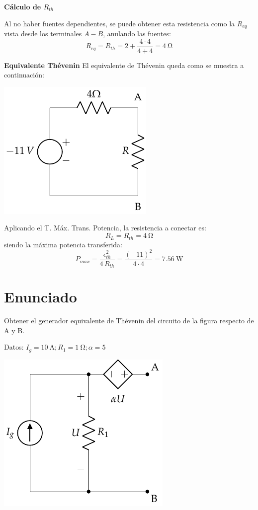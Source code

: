 \textbf{Cálculo de $R_{th}$}

Al no haber fuentes dependientes, se puede obtener esta resistencia
como la $R_{eq}$ vista desde los terminales $A-B$, anulando las
fuentes:
\begin{equation*}
  R_{eq}=R_{th}=2+\dfrac{4\cdot 4}{4+4}=\qty{4}{\ohm}
\end{equation*}

\textbf{Equivalente Thévenin} El equivalente de Thévenin queda como se
muestra a continuación:

\begin{center}
  \includegraphics{figuras/BT1_17_th.pdf}
\end{center}

Aplicando el T. Máx. Trans. Potencia, la resistencia a conectar es:
\begin{equation*}
  R_L=R_{th}=\qty{4}{\ohm}
\end{equation*}
siendo la máxima potencia transferida:
\begin{equation*}
  P_{max}=\dfrac{\epsilon_{th}^2}{4\,R_{th}}=\dfrac{(-11)^2}{4\cdot 4}=\qty{7.56}{\watt}
\end{equation*}


\section{Enunciado}
Obtener el generador equivalente de Thévenin del circuito de la figura respecto de A y B.

Datos: $I_g=\qty{10}{\ampere}; R_1=\qty{1}{\ohm}; \alpha=5$
\begin{center}
  \includegraphics{figuras/Thevenin1.pdf}
\end{center}

